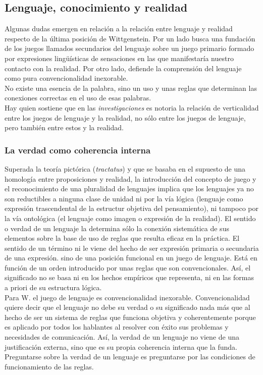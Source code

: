 \documentclass[a4paper, 11pt, twocolumn, spanish]{article}
\begin{document}
\subsection{Lenguaje, conocimiento y realidad}
\label{sec:orga46ae32}
Algunas dudas emergen en relación a la relación entre lenguaje y
realidad respecto de la última posición de Wittgenstein. Por un lado
busca una fundación de los juegos llamados secundarios del lenguaje
sobre un juego primario formado por expresiones lingüísticas de
sensaciones en las que manifestaría nuestro contacto con la
realidad. Por otro lado, defiende la comprensión del lenguaje como
pura convencionalidad inexorable.\\

No existe una esencia de la palabra, sino un uso y unas reglas que
determinan las conexiones correctas en el uso de esas palabras.\\

Hay quien sostiene que en las \emph{investigaciones} es notoria la relación
de verticalidad entre los juegos de lenguaje y la realidad, no sólo
entre los juegos de lenguaje, pero también entre estos y la realidad.

\subsubsection{La verdad como coherencia interna}
\label{sec:org8619b61}
Superada la teoría pictórica (\emph{tractatus}) y que se basaba en el
supuesto de una homología entre proposiciones y realidad, la
introducción del concepto de juego y el reconocimiento de una
pluralidad de lenguajes implica que los lenguajes ya no son
reductibles a ninguna clase de unidad ni por la vía lógica (lenguaje
como expresión trascendental de la estructur objetiva del
pensamiento), ni tampoco por la vía ontológica (el lenguaje como
imagen o expresión de la realidad). El sentido o verdad de un lenguaje
la determina sólo la conexión sistemática de sus elementos sobre la
base de uso de reglas que resulta eficaz en la práctica. El sentido de
un término ni le viene del hecho de ser expresión primaria o
secundaria de una expresión. sino de una posición funcional en un
juego de lenguaje. Está en función de un orden introducido por unas
reglas que son convencionales. Así, el significado no se basa ni en
los hechos empíricos que representa, ni en las formas a priori de su
estructura lógica.\\

Para W.  el juego de lenguaje es convencionalidad
inexorable. Convencionalidad quiere decir que el lenguaje no debe su
verdad o su significado nada más que al hecho de ser un sistema de
reglas que funciona objetiva y coherentemente porque es aplicado por
todos los hablantes al resolver con éxito sus problemas y necesidades
de comunicación. Así, la verdad de un lenguaje no viene de una
justificación externa, sino que es su propia coherencia interna que la
funda. Preguntarse sobre la verdad de un lenguaje es preguntarse por
las condiciones de funcionamiento de las reglas.\\
\end{document}

